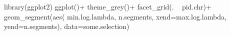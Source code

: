 library(ggplot2)
ggplot()+
  theme_grey()+
  facet_grid(. ~ pid.chr)+
  geom_segment(aes(
    min.log.lambda, n.segments,
    xend=max.log.lambda, yend=n.segments),
    data=some.selection)


